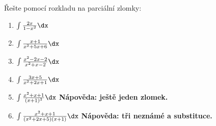 Řešte pomocí rozkladu na parciální zlomky:
\begin{enumerate}

	\item  $\int \frac{2x}{1-x^2} \dx$

	\item  $\int \frac{x+1}{x^2 + 5x + 6} \dx$
	
	\item  $\int \frac{x^2 - 2x - 2}{x^2 + x -2} \dx$
	
	\item  $\int \frac{3x + 5}{x^2 + 2x + 1} \dx$
	
	\item  $\int \frac{x^2 + x + 1}{(x + 1)^3} \dx$
		\textbf{Nápověda: ještě jeden zlomek.}
	
	\item  $\int \frac{x^2 + x + 1}{(x^2 + 2x + 5)(x + 1)} \dx$
		\textbf{Nápověda: tři neznámé a substituce.}

\end{enumerate}

